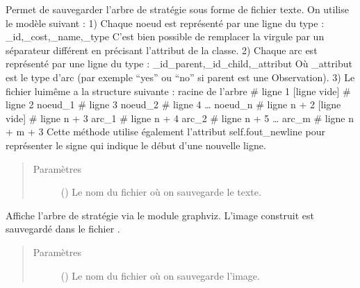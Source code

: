 \documentclass[letterpaper,10pt,french]{sphinxmanual}
\begin{document}
\begin{fulllineitems}
\begin{fulllineitems}
\label{\detokenize{index:StrategyTree.StrategyTree.to_file}}
Permet de sauvegarder l’arbre de stratégie sous forme de fichier texte.
On utilise le modèle suivant :
1) Chaque noeud est représenté par une ligne du type :
\_id,\_cost,\_name,\_type
C’est bien possible de remplacer la virgule par un séparateur
différent en précisant l’attribut  de la classe.
2) Chaque arc est représenté par une ligne du type :
\_id\_parent,\_id\_child,\_attribut
Où \_attribut est le type d’arc (par exemple “yes” ou “no” si parent
est une Observation).
3) Le fichier lui\sphinxhyphen{}même a la structure suivante :
racine de l’arbre    \# ligne 1
{[}ligne vide{]}         \# ligne 2
noeud\_1              \# ligne 3
noeud\_2              \# ligne 4
…
noeud\_n              \# ligne n + 2
{[}ligne vide{]}         \# ligne n + 3
arc\_1                \# ligne n + 4
arc\_2                \# ligne n + 5
…
arc\_m                \# ligne n + m + 3
Cette méthode utilise également l’attribut self.fout\_newline pour
représenter le signe qui indique le début d’une nouvelle ligne.
\begin{quote}\begin{description}
\item[{Paramètres}] \leavevmode
{} (\sphinxstyleliteralemphasis{\sphinxupquote{, }}) \textendash{} Le nom du fichier où on sauvegarde le texte.

\end{description}\end{quote}

\end{fulllineitems}


\begin{fulllineitems}
\label{\detokenize{index:StrategyTree.StrategyTree.visualize}}
Affiche l’arbre de stratégie via le module graphviz. L’image construit
est sauvegardé dans le fichier .
\begin{quote}\begin{description}
\item[{Paramètres}] \leavevmode
{} (\sphinxstyleliteralemphasis{\sphinxupquote{, }}) \textendash{} Le nom du fichier où on sauvegarde l’image.


\end{description}
\end{quote}
\end{fulllineitems}
\end{fulllineitems}
\end{document}
